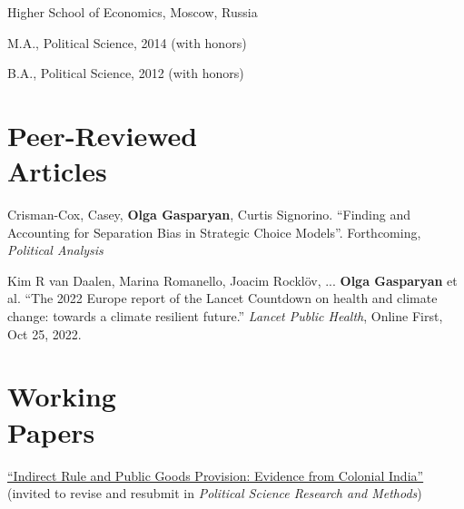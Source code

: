 \documentclass[margin,line,10.95pt]{res}
\newenvironment{list1}{
  \begin{list}{\ding{113}}{%
      \setlength{\itemsep}{0in}
      \setlength{\parsep}{0in} \setlength{\parskip}{0in}
      \setlength{\topsep}{0in} \setlength{\partopsep}{0in}
      \setlength{\leftmargin}{0.17in}}}{\end{list}}
\begin{document}
\begin{resume}
\vspace{-3mm}
{Higher School of Economics, Moscow, Russia}\\
\vspace*{-.1in}
\begin{list1}
 \item[] M.A., Political Science, 2014 (with honors) 
\item[] B.A., Political Science, 2012 (with honors)
\end{list1}



\section{\sc Peer-Reviewed \\ Articles}
Crisman-Cox, Casey, \textbf{Olga Gasparyan}, Curtis Signorino. ``Finding and Accounting for Separation Bias in Strategic Choice Models''. Forthcoming, \textit{Political Analysis} 

\vspace*{-2.5mm}

Kim R van Daalen, Marina Romanello, Joacim Rocklöv, ... \textbf{Olga Gasparyan} et al. ``The 2022 Europe report of the Lancet Countdown on health and climate change: towards a climate resilient future.'' \textit{Lancet Public Health}, Online First, Oct 25, 2022. 


\section{\sc Working \\ Papers}
\href{https://olgasparyan.com/documents/IndRule_paper.pdf}{``Indirect Rule and Public Goods Provision: Evidence from Colonial India''} (invited to revise and resubmit in \textit{Political Science Research and Methods})

\vspace*{-2.5mm}


\end{resume}
\end{document}

